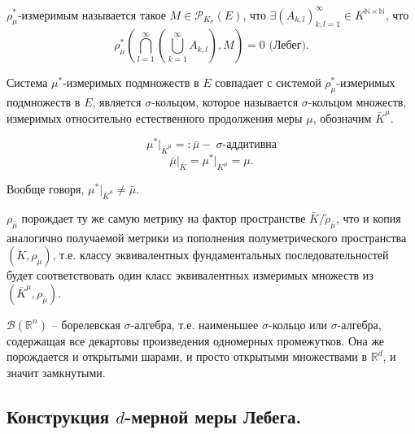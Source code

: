 \documentclass[a4paper, 12pt]{article}
\begin{document}
\begin{definition}
    $\rho_{\mu}^*$-измеримым называется такое $M \in \mathcal{P}_{K_{\sigma}}(E)$, что $\exists (A_{k,l})_{k,l = 1}^{\infty} \in K^{\mathbb{N} \times \mathbb{N}}$, что 
    $$\rho_{\mu}^*\left(\bigcap \limits_{l=1}^{\infty}\left(\bigcup \limits_{k = 1}^{\infty} A_{k,l} \right), M\right) = 0 \text{ (Лебег).}$$
\end{definition}

\begin{problem}[*]
    Система $\mu^*$-измеримых подмножеств в $E$ совпадает с системой $\rho^*_{\mu}$-измеримых подмножеств в $E$, является $\sigma$-кольцом, которое называется $\sigma$-кольцом множеств, измеримых относительно естественного продолжения меры $\mu$, обозначим $\bar{K}^{\mu}$.

    $$ \mu^* \big|_{\bar{K}^{\mu}} =: \bar{\mu} - ~\text{$\sigma$-аддитивна}$$
    $$ \bar{\mu} \big|_{K} = \mu^* \big|_{K^{\mu}} = \mu.$$
\end{problem}

\begin{remark}
    Вообще говоря, $\mu^* \big|_{\bar{K}^{\mu}} \neq \bar{\mu}$.
\end{remark}

\begin{remark}
   $\rho_{\bar{\mu}}$ порождает ту же самую метрику на фактор пространстве $\bar{K}/\tilde{\rho}_{\bar{\mu}}$, что и копия аналогично получаемой метрики из пополнения полуметрического пространства $(K, \rho_{\mu})$, т.е. классу эквивалентных фундаментальных последовательностей будет соответствовать один класс эквивалентных измеримых множеств из $(\bar{K}^{\mu}, \rho_{\bar{\mu}})$.
\end{remark}

\begin{designation}
    $\mathscr{B}(\mathbb{R}^n)$ -- борелевская $\sigma$-алгебра, т.е. наименьшее $\sigma$-кольцо или $\sigma$-алгебра, содержащая все декартовы произведения одномерных промежутков. Она же порождается и открытыми шарами, и просто открытыми множествами в $\mathbb{R}^d$, и значит замкнутыми.
\end{designation}


\subsection*{Конструкция $d$-мерной меры Лебега.}
\end{document}
